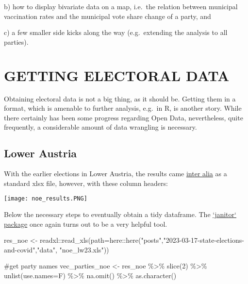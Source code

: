 \documentclass[
  letterpaper,
  DIV=11,
  numbers=noendperiod,
  oneside]{scrartcl}
\newenvironment{Shaded}{\begin{snugshade}}{\end{snugshade}}
\newcommand{\AttributeTok}[1]{\textcolor[rgb]{0.40,0.45,0.13}{#1}}
\newcommand{\CommentTok}[1]{\textcolor[rgb]{0.37,0.37,0.37}{#1}}
\newcommand{\DecValTok}[1]{\textcolor[rgb]{0.68,0.00,0.00}{#1}}
\newcommand{\FunctionTok}[1]{\textcolor[rgb]{0.28,0.35,0.67}{#1}}
\newcommand{\NormalTok}[1]{\textcolor[rgb]{0.00,0.23,0.31}{#1}}
\newcommand{\OtherTok}[1]{\textcolor[rgb]{0.00,0.23,0.31}{#1}}
\newcommand{\SpecialCharTok}[1]{\textcolor[rgb]{0.37,0.37,0.37}{#1}}
\newcommand{\StringTok}[1]{\textcolor[rgb]{0.13,0.47,0.30}{#1}}
\begin{document}
b) how to display bivariate data on a map, i.e.~the relation between
municipal vaccination rates and the municipal vote share change of a
party, and

c) a few smaller side kicks along the way (e.g.~extending the analysis
to all parties).

\hypertarget{sec-getting-electoral-data}{%
\section{GETTING ELECTORAL DATA}\label{sec-getting-electoral-data}}

Obtaining electoral data is not a big thing, as it should be. Getting
them in a format, which is amenable to further analysis, e.g.~in R, is
another story. While there certainly has been some progress regarding
Open Data, nevertheless, quite frequently, a considerable amount of data
wrangling is necessary.

\hypertarget{lower-austria}{%
\subsection{Lower Austria}\label{lower-austria}}

With the earlier elections in Lower Austria, the results came
\href{https://www.noe.gv.at/wahlen/L20231/Download.html\%7Btarget=\%22_blank\%22\%7D}{inter
alia} as a standard xlsx file, however, with these column headers:

\texttt{[image: noe\_results.PNG]}

Below the necessary steps to eventually obtain a tidy dataframe. The
\href{https://cran.r-project.org/web/packages/janitor/vignettes/janitor.html\%7Btarget=\%22_blank\%22\%7D}{`janitor`
package} once again turns out to be a very helpful tool.

\begin{Shaded}
\begin{Highlighting}[]
\NormalTok{res\_noe }\OtherTok{\textless{}{-}}\NormalTok{ readxl}\SpecialCharTok{::}\FunctionTok{read\_xls}\NormalTok{(}\AttributeTok{path=}\NormalTok{here}\SpecialCharTok{::}\FunctionTok{here}\NormalTok{(}\StringTok{"posts"}\NormalTok{,}\StringTok{"2023{-}03{-}17{-}state{-}elections{-}and{-}covid"}\NormalTok{,}\StringTok{"data"}\NormalTok{, }\StringTok{"noe\_lw23.xls"}\NormalTok{))}

\CommentTok{\#get party names}
\NormalTok{vec\_parties\_noe }\OtherTok{\textless{}{-}}\NormalTok{ res\_noe }\SpecialCharTok{\%\textgreater{}\%} 
  \FunctionTok{slice}\NormalTok{(}\DecValTok{2}\NormalTok{) }\SpecialCharTok{\%\textgreater{}\%} 
  \FunctionTok{unlist}\NormalTok{(}\AttributeTok{use.names=}\NormalTok{F) }\SpecialCharTok{\%\textgreater{}\%} 
  \FunctionTok{na.omit}\NormalTok{() }\SpecialCharTok{\%\textgreater{}\%} \FunctionTok{as.character}\NormalTok{()}
\end{Highlighting}
\end{Shaded}
\end{document}
